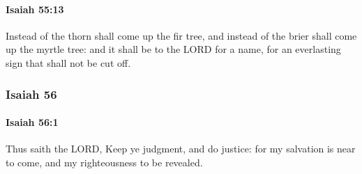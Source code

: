 		\paragraph{Isaiah 55:13} %
			\label{ISAIAH-55-13}

			Instead of the thorn shall come up the fir tree, and instead of the brier shall come up the myrtle tree: and it shall be to the LORD for a name, for an everlasting sign that shall not be cut off.

	\subsubsection{Isaiah 56} %
		\label{ISAIAH-56}

		\paragraph{Isaiah 56:1} %
			\label{ISAIAH-56-1}

			Thus saith the LORD, Keep ye judgment, and do justice: for my salvation is near to come, and my righteousness to be revealed.

